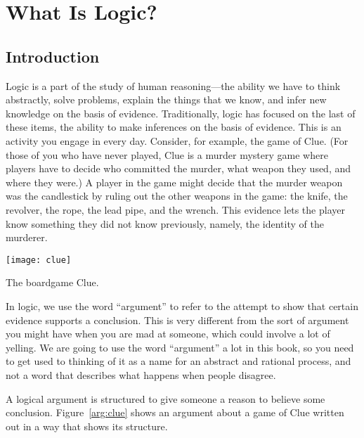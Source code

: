 \chapter{What Is Logic?}\label{ch:what_is_logic}



\section{Introduction}\label{sec:what_is_logic}

Logic is a part of the study of human reasoning---the ability we have to think abstractly, solve problems, explain the things that we know, and infer new knowledge on the basis of evidence. Traditionally, logic has focused on the last of these items, the ability to make inferences on the basis of evidence. This is an activity you engage in every day. Consider, for example, the game of Clue. (For those of you who have never played, Clue is a murder mystery game where players have to decide who committed the murder, what weapon they used, and where they were.) A player in the game might decide that the murder weapon was the candlestick by ruling out the other weapons in the game: the knife, the revolver, the rope, the lead pipe, and the wrench. This evidence lets the player know something they did not know previously, namely, the identity of the murderer.\begin{marginfigure}\texttt{[image: clue]}\caption{The boardgame Clue.}\end{marginfigure}

In logic, we use the word ``argument'' to refer to the attempt to show that certain evidence supports a conclusion. This is very different from the sort of argument you might have when you are mad at someone, which could involve a lot of yelling. We are going to use the word ``argument'' a lot in this book, so you need to get used to thinking of it as a name for an abstract and rational process, and not a word that describes what happens when people disagree.

A logical argument is structured to give someone a reason to believe some conclusion. Figure~\ref{arg:clue} shows an argument about a game of Clue written out in a way that shows its structure.

